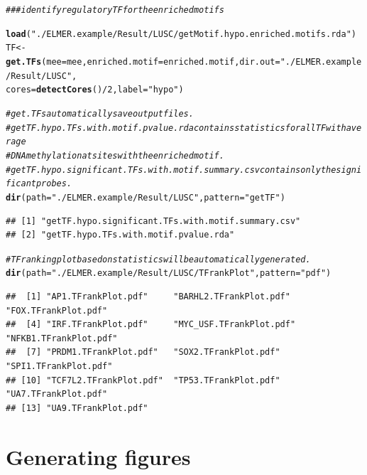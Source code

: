 \documentclass{article}\usepackage[]{graphicx}\usepackage[]{color}
\makeatletter
\newcommand{\hlnum}[1]{\textcolor[rgb]{0.686,0.059,0.569}{#1}}%
\newcommand{\hlstr}[1]{\textcolor[rgb]{0.192,0.494,0.8}{#1}}%
\newcommand{\hlcom}[1]{\textcolor[rgb]{0.678,0.584,0.686}{\textit{#1}}}%
\newcommand{\hlopt}[1]{\textcolor[rgb]{0,0,0}{#1}}%
\newcommand{\hlstd}[1]{\textcolor[rgb]{0.345,0.345,0.345}{#1}}%
\newcommand{\hlkwb}[1]{\textcolor[rgb]{0.69,0.353,0.396}{#1}}%
\newcommand{\hlkwc}[1]{\textcolor[rgb]{0.333,0.667,0.333}{#1}}%
\newcommand{\hlkwd}[1]{\textcolor[rgb]{0.737,0.353,0.396}{\textbf{#1}}}%
\newenvironment{kframe}{%
 \def\at@end@of@kframe{}%
 \ifinner\ifhmode%
  \def\at@end@of@kframe{\end{minipage}}%
  \begin{minipage}{\columnwidth}%
 \fi\fi%
 \def\FrameCommand##1{\hskip\@totalleftmargin \hskip-\fboxsep
 \colorbox{shadecolor}{##1}\hskip-\fboxsep
     \hskip-\linewidth \hskip-\@totalleftmargin \hskip\columnwidth}%
 \MakeFramed {\advance\hsize-\width
   \@totalleftmargin\z@ \linewidth\hsize
   \@setminipage}}%
 {\par\unskip\endMakeFramed%
 \at@end@of@kframe}
\newenvironment{knitrout}{}{} %
\makeatother
\begin{document}
\begin{knitrout}
\color{fgcolor}\begin{kframe}
\begin{alltt}
\hlcom{### identify regulatory TF for the enriched motifs}

\hlkwd{load}\hlstd{(}\hlstr{"./ELMER.example/Result/LUSC/getMotif.hypo.enriched.motifs.rda"}\hlstd{)}
\hlstd{TF} \hlkwb{<-} \hlkwd{get.TFs}\hlstd{(}\hlkwc{mee}\hlstd{=mee,} \hlkwc{enriched.motif}\hlstd{=enriched.motif,}\hlkwc{dir.out}\hlstd{=}\hlstr{"./ELMER.example/Result/LUSC"}\hlstd{,}
              \hlkwc{cores}\hlstd{=}\hlkwd{detectCores}\hlstd{()}\hlopt{/}\hlnum{2}\hlstd{,} \hlkwc{label}\hlstd{=} \hlstr{"hypo"}\hlstd{)}

\hlcom{# get.TFs automatically save output files. }
\hlcom{# getTF.hypo.TFs.with.motif.pvalue.rda contains statistics for all TF with average }
\hlcom{# DNA methylation at sites with the enriched motif.}
\hlcom{# getTF.hypo.significant.TFs.with.motif.summary.csv contains only the significant probes.}
\hlkwd{dir}\hlstd{(}\hlkwc{path} \hlstd{=} \hlstr{"./ELMER.example/Result/LUSC"}\hlstd{,} \hlkwc{pattern} \hlstd{=} \hlstr{"getTF"}\hlstd{)}
\end{alltt}
\begin{verbatim}
## [1] "getTF.hypo.significant.TFs.with.motif.summary.csv"
## [2] "getTF.hypo.TFs.with.motif.pvalue.rda"
\end{verbatim}
\begin{alltt}
\hlcom{# TF ranking plot based on statistics will be automatically generated.}
\hlkwd{dir}\hlstd{(}\hlkwc{path} \hlstd{=} \hlstr{"./ELMER.example/Result/LUSC/TFrankPlot"}\hlstd{,} \hlkwc{pattern} \hlstd{=} \hlstr{"pdf"}\hlstd{)}
\end{alltt}
\begin{verbatim}
##  [1] "AP1.TFrankPlot.pdf"     "BARHL2.TFrankPlot.pdf"  "FOX.TFrankPlot.pdf"    
##  [4] "IRF.TFrankPlot.pdf"     "MYC_USF.TFrankPlot.pdf" "NFKB1.TFrankPlot.pdf"  
##  [7] "PRDM1.TFrankPlot.pdf"   "SOX2.TFrankPlot.pdf"    "SPI1.TFrankPlot.pdf"   
## [10] "TCF7L2.TFrankPlot.pdf"  "TP53.TFrankPlot.pdf"    "UA7.TFrankPlot.pdf"    
## [13] "UA9.TFrankPlot.pdf"
\end{verbatim}
\end{kframe}
\end{knitrout}

\section{Generating figures}
\end{document}
